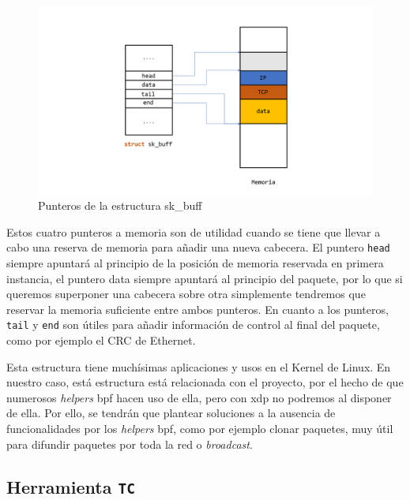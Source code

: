 \begin{figure}[ht]
    \centering
    \includegraphics[width=16cm]{archivos/img/teoria/sk_buff.png}
    \caption{Punteros de la estructura sk\_buff}
    \label{fig:linuxNet_skbuff2}
\end{figure}

Estos cuatro punteros a memoria son de utilidad cuando se tiene que llevar a cabo una reserva de memoria para añadir una nueva cabecera. El puntero \texttt{head} siempre apuntará al principio de la posición de memoria reservada en primera instancia, el puntero data siempre apuntará al principio del paquete, por lo que si queremos superponer una cabecera sobre otra simplemente tendremos que reservar la memoria suficiente entre ambos punteros. En cuanto a los punteros, \texttt{tail} y \texttt{end} son útiles para añadir información de control al final del paquete, como por ejemplo el CRC de Ethernet.\\
\par

Esta estructura tiene muchísimas aplicaciones y usos en el Kernel de Linux. En nuestro caso, está estructura está relacionada con el proyecto, por el hecho de que numerosos \textit{helpers} \gls{bpf} hacen uso de ella, pero con \gls{xdp} no podremos al disponer de ella. Por ello, se tendrán que plantear soluciones a la ausencia de funcionalidades por los \textit{helpers} \gls{bpf}, como por ejemplo clonar paquetes, muy útil para difundir paquetes por toda la red o \textit{broadcast}.




\subsection{Herramienta \texttt{TC}}


